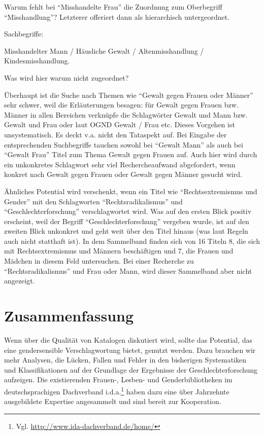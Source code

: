\documentclass[a4paper,
fontsize=11pt,
oneside,
numbers=noperiodatend,
parskip=half-,
bibliography=totoc,
final
]{scrartcl}
\begin{document}
Warum fehlt bei \enquote{Misshandelte Frau} die Zuordnung zum
Oberbegriff \enquote{Misshandlung}? Letzterer offeriert dann als
hierarchisch untergeordnet.

Sachbegriffe:

Misshandelter Mann / Häusliche Gewalt / Altenmisshandlung /
Kindesmisshandlung.

Was wird hier warum nicht zugeordnet?

Überhaupt ist die Suche nach Themen wie \enquote{Gewalt gegen Frauen
oder Männer} sehr schwer, weil die Erläuterungen besagen: für Gewalt
gegen Frauen bzw. Männer in allen Bereichen verknüpfe die Schlagwörter
Gewalt und Mann bzw. Gewalt und Frau oder laut OGND Gewalt / Frau etc.
Dieses Vorgehen ist unsystematisch. Es deckt v.a. nicht den Tataspekt
auf. Bei Eingabe der entsprechenden Suchbegriffe tauchen sowohl bei
\enquote{Gewalt Mann} als auch bei \enquote{Gewalt Frau} Titel zum Thema
Gewalt gegen Frauen auf. Auch hier wird durch ein unkonkretes Schlagwort
sehr viel Rechercheaufwand abgefordert, wenn konkret nach Gewalt gegen
Frauen oder Gewalt gegen Männer gesucht wird.

Ähnliches Potential wird verschenkt, wenn ein Titel wie
\enquote{Rechtsextremismus und Gender} mit den Schlagworten
\enquote{Rechtsradikalismus} und \enquote{Geschlechterforschung}
verschlagwortet wird. Was auf den ersten Blick positiv erscheint, weil
der Begriff \enquote{Geschlechterforschung} vergeben wurde, ist auf den
zweiten Blick unkonkret und geht weit über den Titel hinaus (was laut
Regeln auch nicht statthaft ist). In dem Sammelband finden sich von 16
Titeln 8, die sich mit Rechtsextremismus und Männern beschäftigen und 7,
die Frauen und Mädchen in diesem Feld untersuchen. Bei einer Recherche
zu \enquote{Rechtsradikalismus} und Frau oder Mann, wird dieser
Sammelband aber nicht angezeigt.

\section*{Zusammenfassung}\label{zusammenfassung}

Wenn über die Qualität von Katalogen diskutiert wird, sollte das
Potential, das eine gendersensible Verschlagwortung bietet, genutzt
werden. Dazu brauchen wir mehr Analysen, die Lücken, Fallen und Fehler
in den bisherigen Systematiken und Klassifikationen auf der Grundlage
der Ergebnisse der Geschlechterforschung aufzeigen. Die existierenden
Frauen-, Lesben- und Genderbibliotheken im deutschsprachigen Dachverband
i.d.a.\footnote{Vgl. \url{http://www.ida-dachverband.de/home/}} haben
dazu eine über Jahrzehnte ausgebildete Expertise angesammelt und sind
bereit zur Kooperation.

\end{document}
